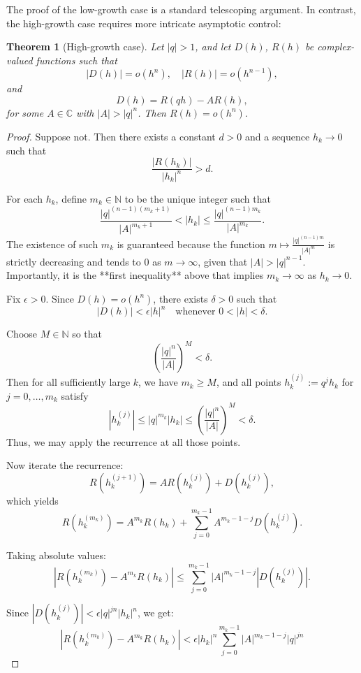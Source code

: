 \documentclass{raex}
\newtheorem{theorem}{Theorem}
\theoremstyle{definition}
\begin{document}
\noindent The proof of the low-growth case is a standard telescoping argument. In contrast, the high-growth case requires more intricate asymptotic control:

\begin{theorem}[High-growth case]\label{th2}
Let \( |q| > 1 \), and let \( D(h) \), \( R(h) \) be complex-valued functions such that
\[
|D(h)| = o(h^n), \quad |R(h)| = o(h^{n-1}),
\]
and
\[
D(h) = R(qh) - A R(h),
\]
for some \( A \in \mathbb{C} \) with \( |A| > |q|^n \). Then \( R(h) = o(h^n) \).
\end{theorem}

\begin{proof}
Suppose not. Then there exists a constant \( d > 0 \) and a sequence \( h_k \to 0 \) such that
\[
\frac{|R(h_k)|}{|h_k|^n} > d.
\]

For each \( h_k \), define \( m_k \in \mathbb{N} \) to be the unique integer such that
\[
\frac{|q|^{(n-1)(m_k+1)}}{|A|^{m_k+1}} < |h_k| \leq \frac{|q|^{(n-1)m_k}}{|A|^{m_k}}.
\]
The existence of such \( m_k \) is guaranteed because the function \( m \mapsto \frac{|q|^{(n-1)m}}{|A|^m} \) is strictly decreasing and tends to 0 as \( m \to \infty \), given that \( |A| > |q|^{n-1} \). Importantly, it is the **first inequality** above that  implies \( m_k \to \infty \) as \( h_k \to 0 \).

Fix \( \epsilon > 0 \). Since \( D(h) = o(h^n) \), there exists \( \delta > 0 \) such that
\[
|D(h)| < \epsilon |h|^n \quad \text{whenever } 0 < |h| < \delta.
\]

Choose \( M \in \mathbb{N} \) so that
\[
\left( \frac{|q|^n}{|A|} \right)^M < \delta.
\]
Then for all sufficiently large \( k \), we have \( m_k \geq M \), and all points \( h_k^{(j)} := q^j h_k \) for \( j = 0, \dots, m_k \) satisfy
\[
|h_k^{(j)}| \leq |q|^{m_k} |h_k| \leq \left( \frac{|q|^n}{|A|} \right)^M < \delta.
\]
Thus, we may apply the recurrence at all those points.

Now iterate the recurrence:
\[
R(h_k^{(j+1)}) = A R(h_k^{(j)}) + D(h_k^{(j)}),
\]
which yields
\[
R(h_k^{(m_k)}) = A^{m_k} R(h_k) + \sum_{j=0}^{m_k - 1} A^{m_k - 1 - j} D(h_k^{(j)}).
\]

Taking absolute values:
\[
\left| R(h_k^{(m_k)}) - A^{m_k} R(h_k) \right| \leq \sum_{j=0}^{m_k - 1} |A|^{m_k - 1 - j} |D(h_k^{(j)})|.
\]

Since \( |D(h_k^{(j)})| < \epsilon |q|^{jn} |h_k|^n \), we get:
\[
\left| R(h_k^{(m_k)}) - A^{m_k} R(h_k) \right|
< \epsilon |h_k|^n \sum_{j=0}^{m_k - 1} |A|^{m_k - 1 - j} |q|^{jn}
\]


\end{proof}
\end{document}
